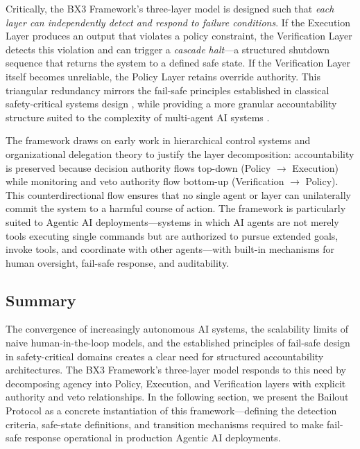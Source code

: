Critically, the BX3 Framework's three-layer model is designed such that \emph{each layer can independently detect and respond to failure conditions}. If the Execution Layer produces an output that violates a policy constraint, the Verification Layer detects this violation and can trigger a \emph{cascade halt}—a structured shutdown sequence that returns the system to a defined safe state. If the Verification Layer itself becomes unreliable, the Policy Layer retains override authority. This triangular redundancy mirrors the fail-safe principles established in classical safety-critical systems design \cite{dijkstra1982}, while providing a more granular accountability structure suited to the complexity of multi-agent AI systems \cite{bansal2019}.

The framework draws on early work in hierarchical control systems \cite{wiener1948} and organizational delegation theory \cite{tristr81} to justify the layer decomposition: accountability is preserved because decision authority flows top-down (Policy $\rightarrow$ Execution) while monitoring and veto authority flow bottom-up (Verification $\rightarrow$ Policy). This counterdirectional flow ensures that no single agent or layer can unilaterally commit the system to a harmful course of action. The framework is particularly suited to Agentic AI deployments—systems in which AI agents are not merely tools executing single commands but are authorized to pursue extended goals, invoke tools, and coordinate with other agents—with built-in mechanisms for human oversight, fail-safe response, and auditability.

\subsection*{Summary}

The convergence of increasingly autonomous AI systems, the scalability limits of naive human-in-the-loop models, and the established principles of fail-safe design in safety-critical domains creates a clear need for structured accountability architectures. The BX3 Framework's three-layer model responds to this need by decomposing agency into Policy, Execution, and Verification layers with explicit authority and veto relationships. In the following section, we present the Bailout Protocol as a concrete instantiation of this framework—defining the detection criteria, safe-state definitions, and transition mechanisms required to make fail-safe response operational in production Agentic AI deployments.